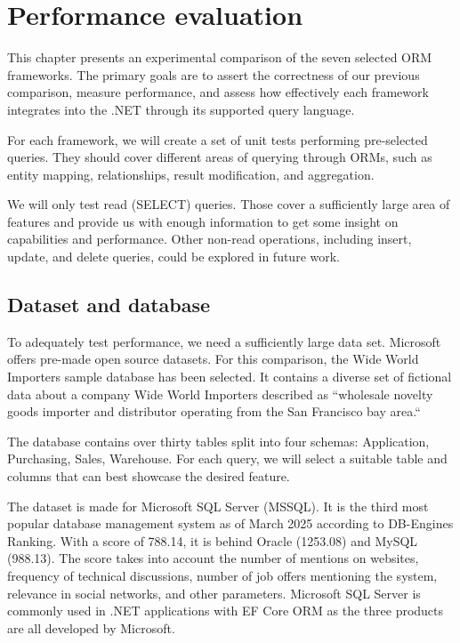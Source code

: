\section{Performance evaluation}\label{sec:perf_eval}

This chapter presents an experimental comparison of the seven selected ORM frameworks. 
The primary goals are to assert the correctness of our previous comparison, measure performance, and assess how effectively each framework integrates into the .NET through its supported query language.

For each framework, we will create a set of unit tests performing pre-selected queries. They should cover different areas of querying through ORMs, such as entity mapping, relationships, result modification, and aggregation.

We will only test read (SELECT) queries. Those cover a sufficiently large area of features and provide us with enough information to get some insight on capabilities and performance. Other non-read operations, including insert, update, and delete queries, could be explored in future work.

\subsection{Dataset and database}\label{sec:dataset_database}
To adequately test performance, we need a sufficiently large data set. Microsoft offers pre-made open source datasets.
For this comparison, the Wide World Importers sample database \cite{microsoftWWI} has been selected.
It contains a diverse set of fictional data about a company Wide World Importers described as ``wholesale novelty goods importer and distributor operating from the San Francisco bay area.``\cite{microsoftWWI}

The database contains over thirty tables split into four schemas: Application, Purchasing, Sales, Warehouse. For each query, we will select a suitable table and columns that can best showcase the desired feature.

The dataset is made for Microsoft SQL Server (MSSQL). It is the third most popular database management system as of March 2025 according to DB-Engines Ranking\cite{DBEngines2025Ranking}. With a score of 788.14, it is behind Oracle (1253.08) and MySQL (988.13). The score takes into account the number of mentions on websites, frequency of technical discussions, number of job offers mentioning the system, relevance in social networks, and other parameters.\cite{DBEnginesRankingMetrics} 
Microsoft SQL Server is commonly used in .NET applications with EF Core ORM as the three products are all developed by Microsoft.  


